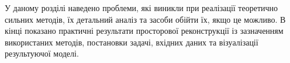 У даному розділі наведено проблеми,
які виникли при реалізації теоретично сильних методів,
їх детальний аналіз та засоби обійти їх, якщо це можливо.
В кінці показано практичні результати просторової реконструкції
із зазначенням використаних методів, постановки задачі,
вхідних даних та візуалізації результуючої моделі.
